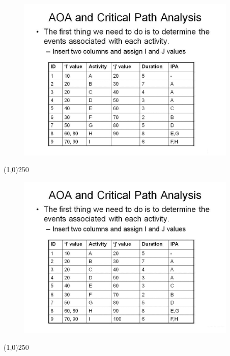 \begin{frame}
\begin{figure}
	\centering
		\includegraphics[width = 10.5cm]{oldnotes/Slide76.jpg}
\end{figure}
\end{frame}
\begin{center}\line(1,0){250}\end{center}


\begin{frame}
\begin{figure}
	\centering
		\includegraphics[width = 10.5cm]{oldnotes/Slide77.jpg}
\end{figure}
\end{frame}
\begin{center}\line(1,0){250}\end{center}


